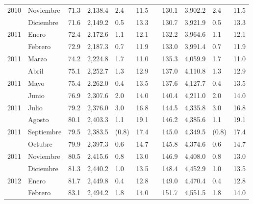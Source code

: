 \begin{center}
\begin{longtable}{llp{1.1cm}p{1.2cm}p{1.2cm}p{1.2cm}rp{1.2cm}p{1.2cm}p{1.2cm}p{1.2cm}}
		\multicolumn{1}{l}{	2010	}&	Noviembre	&	 71.3 	&	 2,138.4 	&	 2.4 	&	 11.5 	&  &	 130.1 	&	 3,902.2 	&	 2.4 	&	 11.5 	\\
		\rowcolor{color1!5!white}\multicolumn{1}{l}{	2010	}&	Diciembre	&	 71.6 	&	 2,149.2 	&	 0.5 	&	 13.3 	&  &	 130.7 	&	 3,921.9 	&	 0.5 	&	 13.3 	\\
		\multicolumn{1}{l}{	2011	}&	Enero	&	 72.4 	&	 2,172.6 	&	 1.1 	&	 12.1 	&  &	 132.2 	&	 3,964.6 	&	 1.1 	&	 12.1 	\\
		\rowcolor{color1!5!white}\multicolumn{1}{l}{	2011	}&	Febrero	&	 72.9 	&	 2,187.3 	&	 0.7 	&	 11.9 	&  &	 133.0 	&	 3,991.4 	&	 0.7 	&	 11.9 	\\
		\multicolumn{1}{l}{	2011	}&	Marzo	&	 74.2 	&	 2,224.8 	&	 1.7 	&	 11.0 	&  &	 135.3 	&	 4,059.9 	&	 1.7 	&	 11.0 	\\
		\rowcolor{color1!5!white}\multicolumn{1}{l}{	2011	}&	Abril	&	 75.1 	&	 2,252.7 	&	 1.3 	&	 12.9 	&  &	 137.0 	&	 4,110.8 	&	 1.3 	&	 12.9 	\\
		\multicolumn{1}{l}{	2011	}&	Mayo	&	 75.4 	&	 2,262.0 	&	 0.4 	&	 13.5 	&  &	 137.6 	&	 4,127.7 	&	 0.4 	&	 13.5 	\\
		\rowcolor{color1!5!white}\multicolumn{1}{l}{	2011	}&	Junio	&	 76.9 	&	 2,307.6 	&	 2.0 	&	 14.0 	&  &	 140.4 	&	 4,211.0 	&	 2.0 	&	 14.0 	\\
		\multicolumn{1}{l}{	2011	}&	Julio	&	 79.2 	&	 2,376.0 	&	 3.0 	&	 16.8 	&  &	 144.5 	&	 4,335.8 	&	 3.0 	&	 16.8 	\\
		\rowcolor{color1!5!white}\multicolumn{1}{l}{	2011	}&	Agosto	&	 80.1 	&	 2,403.3 	&	 1.1 	&	 19.1 	&  &	 146.2 	&	 4,385.6 	&	 1.1 	&	 19.1 	\\
		\multicolumn{1}{l}{	2011	}&	Septiembre	&	 79.5 	&	 2,383.5 	&	 (0.8)	&	 17.4 	&  &	 145.0 	&	 4,349.5 	&	 (0.8)	&	 17.4 	\\
		\rowcolor{color1!5!white}\multicolumn{1}{l}{	2011	}&	Octubre	&	 79.9 	&	 2,397.3 	&	 0.6 	&	 14.7 	&  &	 145.8 	&	 4,374.6 	&	 0.6 	&	 14.7 	\\
		\multicolumn{1}{l}{	2011	}&	Noviembre	&	 80.5 	&	 2,415.6 	&	 0.8 	&	 13.0 	&  &	 146.9 	&	 4,408.0 	&	 0.8 	&	 13.0 	\\
		\rowcolor{color1!5!white}\multicolumn{1}{l}{	2011	}&	Diciembre	&	 81.3 	&	 2,440.2 	&	 1.0 	&	 13.5 	&  &	 148.4 	&	 4,452.9 	&	 1.0 	&	 13.5 	\\
		\multicolumn{1}{l}{	2012	}&	Enero	&	 81.7 	&	 2,449.8 	&	 0.4 	&	 12.8 	&  &	 149.0 	&	 4,470.4 	&	 0.4 	&	 12.8 	\\
		\rowcolor{color1!5!white}\multicolumn{1}{l}{	2012	}&	Febrero	&	 83.1 	&	 2,494.2 	&	 1.8 	&	 14.0 	&  &	 151.7 	&	 4,551.5 	&	 1.8 	&	 14.0 	\\

\end{longtable}
\end{center}
